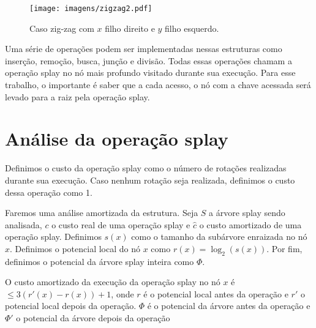 {\begin{figure}[H]
\begin{comment}
            \begin{scope}[xshift=12cm, local bounding box=scope3]
                \Tree [.$x$ [.$y$ \node[alpha]{a}; \node[alpha]{b};] [.$z$  \node[alpha]{c}; \node[alpha]{d};]]
            \end{scope}
                
            \draw[->] ([yshift=-0.5*\ht\strutbox,xshift=0.3cm]scope2.east) -- node [n] {} ([yshift=-0.5*\ht\strutbox,xshift=-0.3cm]scope3.west);
                
            \draw[->] ([yshift=-3.67cm, xshift=0.67cm]scope2.north) arc (-18:198:0.7cm);
                \draw[->,red] ([yshift=-3.69cm, xshift=-0.82cm]scope2.north) arc (198:-18:0.86cm);
                
    \end{tikzpicture}
    \end{comment}
    \texttt{[image: imagens/zigzag2.pdf]}
    \caption{Caso zig-zag com $x$ filho direito e $y$ filho esquerdo.}
\end{figure}
        
}

Uma série de operações podem ser implementadas nessas estruturas como inserção, remoção, busca, junção e divisão. Todas essas operações chamam a operação splay no nó mais profundo visitado durante sua execução. Para esse trabalho, o importante é saber que a cada acesso, o nó com a chave acessada será levado para a raiz pela operação splay.

\section{Análise da operação splay}

Definimos o custo da operação splay como o número de rotações realizadas durante sua execução. Caso nenhum rotação seja realizada, definimos o custo dessa operação como 1. 

Faremos uma análise amortizada da estrutura. Seja $S$ a árvore splay sendo analisada, $c$ o custo real de uma operação splay e \( \hat{c}\) o custo amortizado de uma operação splay. Definimos $s(x)$ como o tamanho da subárvore enraizada no nó $x$. Definimos o potencial local do nó $x$ como $r(x) = \log_2(s(x))$. Por fim, definimos o potencial da árvore splay inteira como $\Phi$.

\begin{lemma}
    O custo amortizado da execução da operação splay no nó $x$ é $\leq 3(r'(x) - r(x)) + 1$, onde $r$ é o potencial local antes da operação e $r'$ o potencial local depois da operação. $\Phi$ é o potencial da árvore antes da operação e $\Phi'$ o potencial da árvore depois da operação
\end{lemma}

